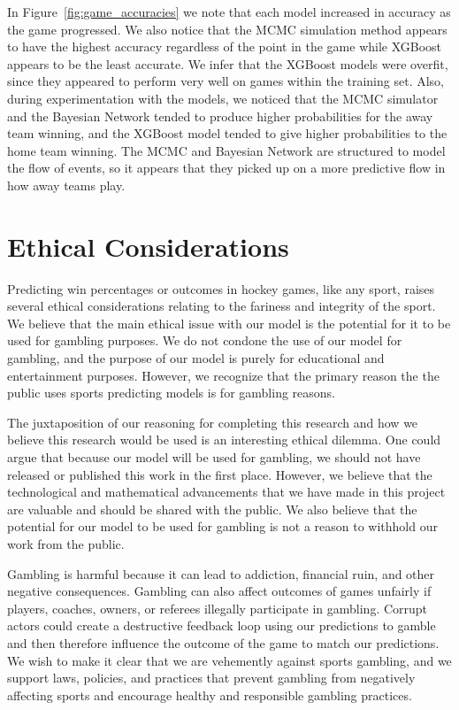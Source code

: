 \documentclass[11pt]{article}
\begin{document}

In Figure~\ref{fig:game_accuracies} we note that each model increased in accuracy as the game progressed. We also notice that the MCMC simulation method appears to have the highest accuracy regardless of the point in the game while XGBoost appears to be the least accurate. We infer that the XGBoost models were overfit, since they appeared to perform very well on games within the training set. Also, during experimentation with the models, we noticed that the MCMC simulator and the Bayesian Network tended to produce higher probabilities for the away team winning, and the XGBoost model tended to give higher probabilities to the home team winning. The MCMC and Bayesian Network are structured to model the flow of events, so it appears that they picked up on a more predictive flow in how away teams play.

\section{Ethical Considerations}
Predicting win percentages or outcomes in hockey games, like any sport, raises several ethical considerations relating to the fariness and integrity of the sport. We believe that the main ethical issue with our model is the potential for it to be used for gambling purposes. 
We do not condone the use of our model for gambling, and the purpose of our model is purely for educational and entertainment purposes. However, we recognize that the primary reason the the public uses sports predicting models is for gambling reasons.

The juxtaposition of our reasoning for completing this research and how we believe this research would be used is an interesting ethical dilemma. 
One could argue that because our model will be used for gambling, we should not have released or published this work in the first place. 
However, we believe that the technological and mathematical advancements that we have made in this project are valuable and should be shared with the public. 
We also believe that the potential for our model to be used for gambling is not a reason to withhold our work from the public.

Gambling is harmful because it can lead to addiction, financial ruin, and other negative consequences. Gambling can also affect outcomes of games unfairly if players, coaches, owners, or referees illegally participate in gambling. Corrupt actors could create a destructive feedback loop using our predictions to gamble and then therefore influence the outcome of the game to match our predictions.
We wish to make it clear that we are vehemently against sports gambling, and we support laws, policies, and practices that prevent gambling from negatively affecting sports and encourage healthy and responsible gambling practices.
\end{document}
